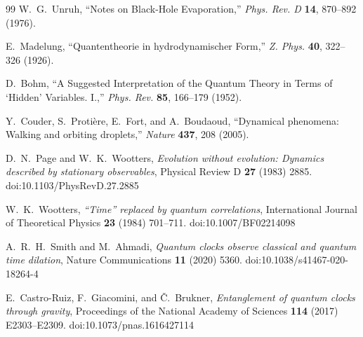 \documentclass[pdflatex,sn-mathphys-num]{sn-jnl}
\begin{document}
\begin{thebibliography}{99}
                W.~G.~Unruh,
                ``Notes on Black-Hole Evaporation,''
                \emph{Phys. Rev. D} \textbf{14}, 870--892 (1976).

                E.~Madelung,
                ``Quantentheorie in hydrodynamischer Form,''
                \emph{Z. Phys.} \textbf{40}, 322--326 (1926).

                D.~Bohm,
                ``A Suggested Interpretation of the Quantum Theory in Terms of `Hidden' Variables. I.,''
                \emph{Phys. Rev.} \textbf{85}, 166--179 (1952).

                Y.~Couder, S.~Proti\`ere, E.~Fort, and A.~Boudaoud,
                ``Dynamical phenomena: Walking and orbiting droplets,''
                \emph{Nature} \textbf{437}, 208 (2005).

                D.~N.~Page and W.~K.~Wootters,
                \textit{Evolution without evolution: Dynamics described by stationary observables},
                Physical Review D \textbf{27} (1983) 2885.
                doi:10.1103/PhysRevD.27.2885

                W.~K.~Wootters,
                \textit{``Time'' replaced by quantum correlations},
                International Journal of Theoretical Physics \textbf{23} (1984) 701--711.
                doi:10.1007/BF02214098

                A.~R.~H.~Smith and M.~Ahmadi,
                \textit{Quantum clocks observe classical and quantum time dilation},
                Nature Communications \textbf{11} (2020) 5360.
                doi:10.1038/s41467-020-18264-4

                E.~Castro-Ruiz, F.~Giacomini, and \v{C}.~Brukner,
                \textit{Entanglement of quantum clocks through gravity},
                Proceedings of the National Academy of Sciences \textbf{114} (2017) E2303--E2309.
                doi:10.1073/pnas.1616427114

            \end{thebibliography}
\end{document}
